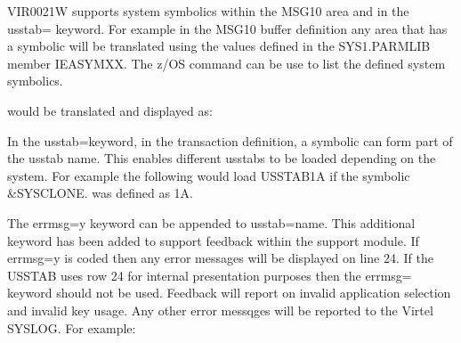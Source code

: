 \documentclass[letterpaper,10pt,english]{sphinxmanual}
\begin{document}
\sphinxAtStartPar
VIR0021W supports system symbolics within the MSG10 area and in the usstab= keyword. For example in the MSG10 buffer definition any area that has a symbolic will be translated using the values defined in the SYS1.PARMLIB member IEASYMXX. The z/OS command  can be use to list the defined system symbolics.

\begin{sphinxVerbatim}[commandchars=\\\{\}]
 
\end{sphinxVerbatim}

\sphinxAtStartPar
would be translated and displayed as:\sphinxhyphen{}

\begin{sphinxVerbatim}[commandchars=\\\{\}]
 
\end{sphinxVerbatim}

\sphinxAtStartPar
In the usstab=keyword, in the transaction definition, a symbolic can form part of the usstab name. This enables different usstabs to be loaded depending on the system. For example the following would load USSTAB1A if the symbolic \&SYSCLONE. was defined as 1A.

\begin{sphinxVerbatim}[commandchars=\\\{\}]
\end{sphinxVerbatim}

\sphinxAtStartPar
{}

\sphinxAtStartPar
The errmsg=y keyword can be appended to usstab=name. This additional keyword has been added to support feedback within the support module. If errmsg=y is coded then any error messages will be displayed on line 24. If the USSTAB uses row 24 for internal presentation purposes then the errmsg= keyword should not be used. Feedback will report on invalid application selection and invalid key usage. Any other error messqges will be reported to the Virtel SYSLOG. For example:\sphinxhyphen{}

\begin{sphinxVerbatim}[commandchars=\\\{\}]
\end{sphinxVerbatim}
\end{document}
